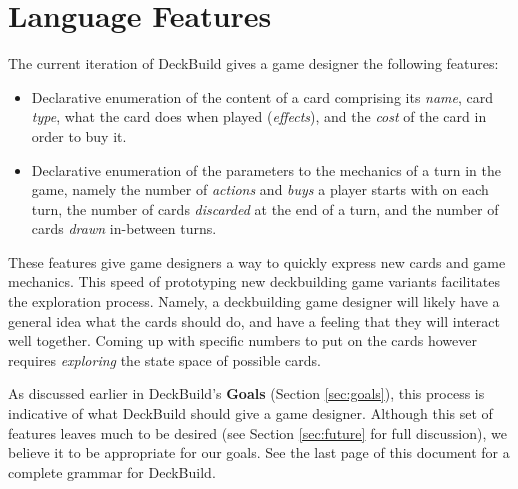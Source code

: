 
\section{Language Features}
\label{sec:features}
The current iteration of DeckBuild gives a game designer the
following features:

\begin{itemize}
\item Declarative enumeration of the content of a card comprising its
      \emph{name}, card \emph{type},
      what the card does when played (\emph{effects}), and the \emph{cost}
      of the card in order to buy it.
\item Declarative enumeration of the parameters to the mechanics of a turn in
      the game, namely the number
      of \emph{actions} and \emph{buys} a player starts with on each turn,
      the number of cards \emph{discarded} at the end of a turn, and the
      number of cards \emph{drawn} in-between turns.
\end{itemize}

These features give game designers a way to quickly express new cards and
game mechanics. This speed of prototyping new deckbuilding game variants
facilitates the exploration process. Namely, a deckbuilding game designer
will likely have a general idea what the cards should do, and have a
feeling that they will interact well together. Coming up with specific
numbers to put on the cards however requires \emph{exploring} the state
space of possible cards.

As discussed earlier in DeckBuild's {\bf Goals} (Section \ref{sec:goals}),
this process is indicative of what DeckBuild should give a game designer.
Although this set of features leaves much to be desired (see Section
\ref{sec:future} for full discussion), we believe it to be appropriate
for our goals. See the last page of this document for a complete grammar
for DeckBuild.

%

